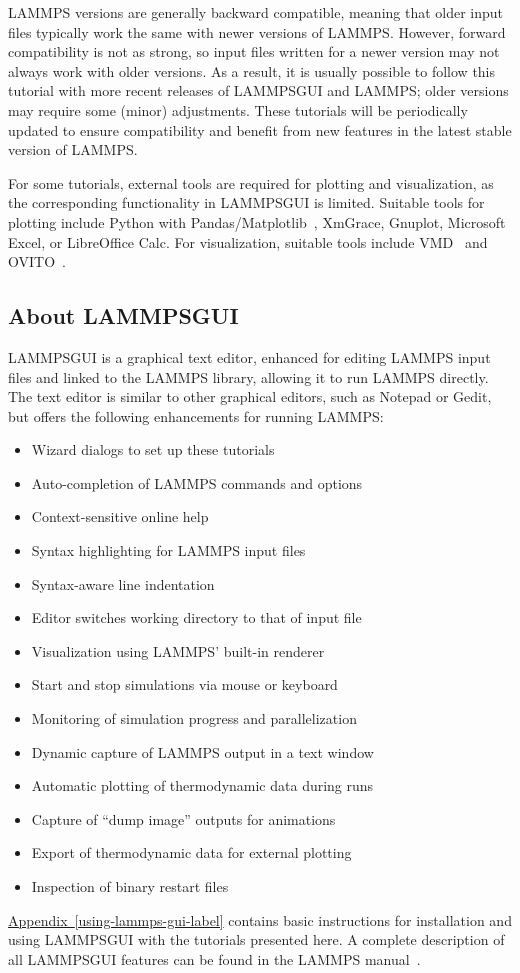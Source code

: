 \documentclass[9pt,tutorial]{livecoms}
\newcommand{\lammpsgui}{\textsf{LAMMPS\textendash GUI}}
\begin{document}
LAMMPS versions are generally backward compatible, meaning that older
input files typically work the same with newer versions of LAMMPS.
However, forward compatibility is not as strong, so input files written
for a newer version may not always work with older versions.  As a
result, it is usually possible to follow this tutorial with more recent
releases of \lammpsgui{} and LAMMPS; older versions may require some
(minor) adjustments.  These tutorials will be periodically updated to
ensure compatibility and benefit from new features in the latest stable
version of LAMMPS.

For some tutorials, external tools are required for plotting and
visualization, as the corresponding functionality in \lammpsgui{} is
limited.  Suitable tools for plotting include Python with
Pandas/Matplotlib~\cite{van1995python,hunter2007Matplotlib}, XmGrace,
Gnuplot, Microsoft Excel, or LibreOffice Calc.  For visualization,
suitable tools include VMD~\cite{vmd_home,humphrey1996vmd} and
OVITO~\cite{ovito_home,stukowski2009visualization}.

\subsection{About \lammpsgui{}}

\lammpsgui{} is a graphical text editor, enhanced for editing LAMMPS
input files and linked to the LAMMPS library, allowing it to run LAMMPS
directly.  The text editor is similar to other graphical
editors, such as Notepad or Gedit, but offers the following enhancements
for running LAMMPS:
\begin{itemize}
  \item Wizard dialogs to set up these tutorials
  \item Auto-completion of LAMMPS commands and options
  \item Context-sensitive online help
  \item Syntax highlighting for LAMMPS input files
  \item Syntax-aware line indentation
  \item Editor switches working directory to that of input file
  \item Visualization using LAMMPS' built-in renderer
  \item Start and stop simulations via mouse or keyboard
  \item Monitoring of simulation progress and parallelization
  \item Dynamic capture of LAMMPS output in a text window
  \item Automatic plotting of thermodynamic data during runs
  \item Capture of ``dump image'' outputs for animations
  \item Export of thermodynamic data for external plotting
  \item Inspection of binary restart files
\end{itemize}
\hyperref[using-lammps-gui-label]{Appendix~\ref{using-lammps-gui-label}}
contains basic instructions for installation and using \lammpsgui{} with
the tutorials presented here.  A complete description of all \lammpsgui{}
features can be found in the LAMMPS manual~\cite{lammps_gui_docs}.
\end{document}
